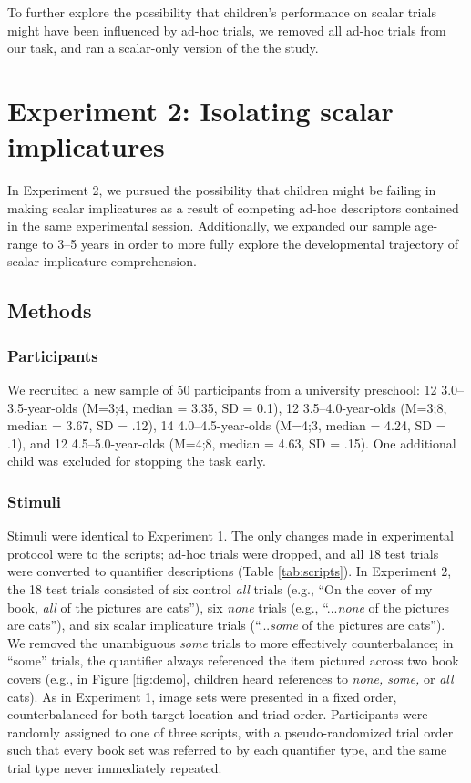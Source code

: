 \documentclass[man]{apa2}
\begin{document}
To further explore the possibility that children's performance on scalar trials might have been influenced by ad-hoc trials, we removed all ad-hoc trials from our task, and ran a scalar-only version of the the study.

\section{Experiment 2: Isolating scalar implicatures}
In Experiment 2, we pursued the possibility that children might be failing in making scalar implicatures as a result of competing ad-hoc descriptors contained in the same experimental session. Additionally, we expanded our sample age-range to 3--5 years in order to more fully explore the developmental trajectory of scalar implicature comprehension. 

\subsection{Methods}
\subsubsection{Participants} 

We recruited a new sample of 50 participants from a university preschool: 12 3.0--3.5-year-olds (M=3;4, median = 3.35, SD = 0.1), 12 3.5--4.0-year-olds (M=3;8, median = 3.67, SD = .12), 14 4.0--4.5-year-olds (M=4;3, median = 4.24, SD = .1), and 12 4.5--5.0-year-olds (M=4;8, median = 4.63, SD = .15). One additional child was excluded for stopping the task early.

\subsubsection{Stimuli}
Stimuli were identical to Experiment 1. The only changes made in experimental protocol were to the scripts; ad-hoc trials were dropped, and all 18 test trials were converted to quantifier descriptions (Table \ref{tab:scripts}). In Experiment 2, the 18 test trials consisted of six control \textit{all} trials (e.g., ``On the cover of my book, \textit{all} of the pictures are cats''), six \textit{none} trials (e.g., ``...\textit{none} of the pictures are cats''), and six scalar implicature trials (``...\textit{some} of the pictures are cats''). We removed the unambiguous \textit{some} trials to more effectively counterbalance; in ``some'' trials, the quantifier always referenced the item pictured across two book covers (e.g., in Figure \ref{fig:demo}, children heard references to \textit{none, some,} or \textit{all} cats). As in Experiment 1, image sets were presented in a fixed order, counterbalanced for both target location and triad order. Participants were randomly assigned to one of three scripts, with a pseudo-randomized trial order such that every book set was referred to by each quantifier type, and the same trial type never immediately repeated.
\end{document}
